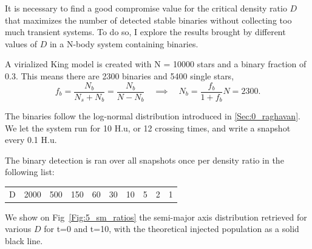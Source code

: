 It is necessary to find a good compromise value for the critical density ratio $D$ that maximizes the number of detected stable binaries without collecting too much transient systems. To do so, I explore the results brought by different values of $D$ in a N-body system containing binaries.

A virialized King model is created with N = 10000 stars and a binary fraction of 0.3. This means there are 2300 binaries and 5400 single stars,
\begin{equation}
f_b = \frac{N_b}{N_s + N_b} = \frac{N_b}{N-N_b} \quad \implies \quad N_b = \frac{f_b}{1+f_b} N = 2300.
\end{equation}

The binaries follow the \cite{Raghavan2010} log-normal distribution introduced in \ref{Sec:0_raghavan}. We let the system run for 10 H.u, or 12 crossing times, and write a snapshot every 0.1 H.u.

The binary detection is ran over all snapshots once per density ratio in the following list:

\begin{center}
\begin{tabular}{l|rrrrrrrrr}
\centering
D  &  2000 & 500 & 150 & 60 & 30 & 10 & 5 & 2 & 1\\ 
\end{tabular}
\end{center}

We show on Fig~\ref{Fig:5_sm_ratios} the semi-major axis distribution retrieved for various $D$ for t=0 and t=10, with the theoretical injected population as a solid black line.




